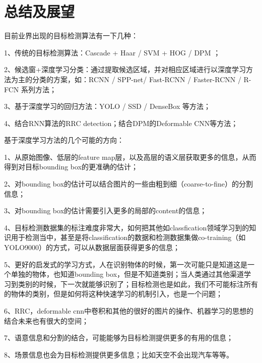 \section{总结及展望}
\setcounter{figure}{0}
目前业界出现的目标检测算法有一下几种：

1、传统的目标检测算法：Cascade + Haar / SVM + HOG / DPM ；

2、候选窗+深度学习分类：通过提取候选区域，并对相应区域进行以深度学习方法为主的分类的方案，如：RCNN / SPP-net/ Fast-RCNN / Faster-RCNN  / R-FCN 系列方法；

3、基于深度学习的回归方法：YOLO / SSD / DenseBox 等方法；

4、结合RNN算法的RRC detection；结合DPM的Deformable CNN等方法；

基于深度学习方法的几个可能的方向：

1、从原始图像、低层的feature map层，以及高层的语义层获取更多的信息，从而得到对目标bounding box的更准确的估计；

2、对bounding box的估计可以结合图片的一些由粗到细（coarse-to-fine）的分割信息；

3、对bounding box的估计需要引入更多的局部的content的信息；

4、目标检测数据集的标注难度非常大，如何把其他如classfication领域学习到的知识用于检测当中，甚至是将classification的数据和检测数据集做co-training（如YOLO9000）的方式，可以从数据层面获得更多的信息；

5、更好的启发式的学习方式，人在识别物体的时候，第一次可能只是知道这是一个单独的物体，也知道bounding box，但是不知道类别；当人类通过其他渠道学习到类别的时候，下一次就能够识别了；目标检测也是如此，我们不可能标注所有的物体的类别，但是如何将这种快速学习的机制引入，也是一个问题；

6、RRC，deformable cnn中卷积和其他的很好的图片的操作、机器学习的思想的结合未来也有很大的空间；

7、语意信息和分割的结合，可能能够为目标检测提供更多的有用的信息；

8、场景信息也会为目标检测提供更多信息；比如天空不会出现汽车等等。